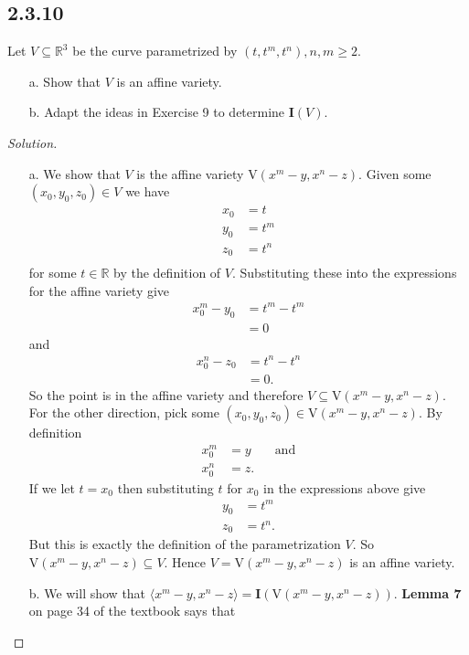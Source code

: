 \documentclass[]{article}
\newcommand\<{\langle}
\renewcommand\>{\rangle}
\newcommand{\RR}{\ensuremath{\mathbb{R}}}
\newenvironment{solution}
{
	\begin{proof}[Solution] \text{ }
		\\
	}
	{
	\end{proof}
}
\begin{document}
\subsection*{2.3.10} Let $V \subseteq \RR^3$ be the curve parametrized by $\left(t, t^m, t^n\right), n, m \geq 2.$
\begin{enumerate}
	\item[a.] Show that $V$ is an affine variety.
	\item[b.] Adapt the ideas in Exercise 9 to determine $\textbf{I}(V)$.
\end{enumerate}
\begin{solution}
	\begin{enumerate}
		\item[a.] We show that $V$ is the affine variety $\text{V}(x^m - y, x^n - z)$. Given some $(x_0, y_0, z_0) \in V$ we have
		\begin{align*}
			x_0 &= t \\
			y_0 &= t^m \\
			z_0 &= t^n \\
		\end{align*}
		for some $t \in \RR$ by the definition of $V$. Substituting these into the expressions for the affine variety give
		\begin{align*}
			x_0^m - y_0 &= t^m - t^m \\
			&= 0
		\end{align*}
		and
		\begin{align*}
			x_0^n - z_0 &= t^n - t^n \\
			&= 0.
		\end{align*}
		So the point is in the affine variety and therefore $V \subseteq \text{V}(x^m - y, x^n - z)$. For the other direction, pick some $\left(x_0, y_0, z_0\right) \in \text{V}(x^m - y, x^n - z)$. By definition
		\begin{align*}
			x_0^m &= y  && \text{and} \\
			x_0^n &= z.
		\end{align*}
		If we let $t = x_0$ then substituting $t$ for $x_0$ in the expressions above give
		\begin{align*}
			y_0 &= t^m \\
			z_0 &= t^n.
		\end{align*}
		But this is exactly the definition of the parametrization $V$. So $\text{V}(x^m - y, x^n - z) \subseteq V$. Hence $V = \text{V}(x^m - y, x^n - z)$ is an affine variety.
		\item[b.] We will show that $\<x^m - y, x^n - z\> = \textbf{I}\left(\text{V}\left(x^m - y, x^n - z\right)\right)$. \textbf{Lemma 7} on page 34 of the textbook says that

\end{enumerate}
\end{solution}
\end{document}
